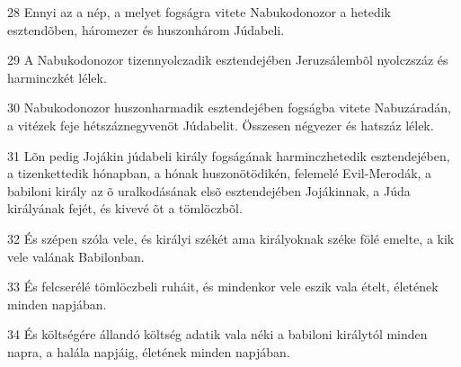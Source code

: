 \par 28 Ennyi az a nép, a melyet fogságra vitete Nabukodonozor a hetedik esztendõben, háromezer és huszonhárom Júdabeli.
\par 29 A Nabukodonozor tizennyolczadik esztendejében Jeruzsálembõl nyolczszáz és harminczkét lélek.
\par 30 Nabukodonozor huszonharmadik esztendejében fogságba vitete Nabuzáradán, a vitézek feje hétszáznegyvenöt Júdabelit. Összesen négyezer és hatszáz lélek.
\par 31 Lõn pedig Jojákin júdabeli király fogságának harminczhetedik esztendejében, a tizenkettedik hónapban, a hónak huszonötödikén, felemelé Evil-Merodák, a babiloni király az õ uralkodásának elsõ esztendejében Jojákinnak, a Júda királyának fejét, és kivevé õt a tömlöczbõl.
\par 32 És szépen szóla vele, és királyi székét ama királyoknak széke fölé emelte, a kik vele valának Babilonban.
\par 33 És felcserélé tömlöczbeli ruháit, és mindenkor vele eszik vala ételt, életének minden napjában.
\par 34 És költségére állandó költség adatik vala néki a babiloni királytól minden napra, a halála napjáig, életének minden napjában.


